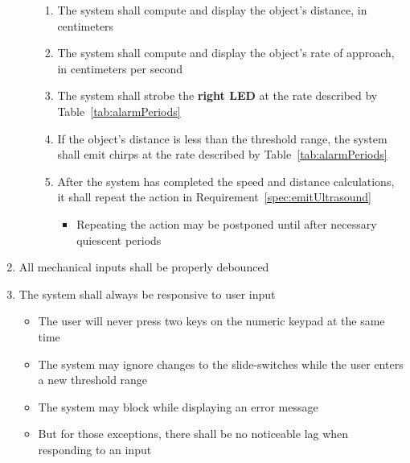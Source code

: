 \begin{enumerate}
\begin{enumerate}
\begin{enumerate}
                    \item The system shall compute and display the object's distance, in centimeters
                    \item The system shall compute and display the object's rate of approach, in centimeters per second
                    \item The system shall strobe the \textbf{right LED} at the rate described by Table~\ref{tab:alarmPeriods}
                    \item If the object's distance is less than the threshold range, the system shall emit chirps at the rate described by Table~\ref{tab:alarmPeriods}
                    \item After the system has completed the speed and distance calculations, it shall repeat the action in Requirement~\ref{spec:emitUltrasound}
                        {\footnotesize
                        \begin{itemize}
                            \item Repeating the action may be postponed until after necessary quiescent periods
                        \end{itemize}}
                \end{enumerate}
        \end{enumerate}
    \item All mechanical inputs shall be properly debounced
    \item The system shall always be responsive to user input
        \begin{itemize}
            \item The user will never press two keys on the numeric keypad at the same time
            \item The system may ignore changes to the slide-switches while the user enters a new threshold range
            \item The system may block while displaying an error message
            \item But for those exceptions, there shall be no noticeable lag when responding to an input
        \end{itemize}
\end{enumerate}

